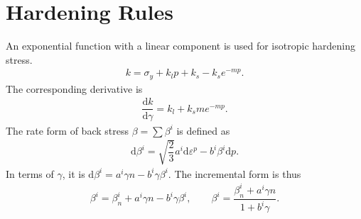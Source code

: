 \documentclass[a4paper,10pt,fleqn]{article}
\newcommand*{\md}[1]{\mathrm{d}#1}
\newcommand*{\ddfrac}[2]{\dfrac{\md#1}{\md#2}}
\begin{document}
\section{Hardening Rules}
An exponential function with a linear component is used for isotropic hardening stress.
\begin{gather}
k=\sigma_y+k_lp+k_s-k_se^{-mp}.
\end{gather}
The corresponding derivative is
\begin{gather}
\ddfrac{k}{\gamma}=k_l+k_sme^{-mp}.
\end{gather}
The rate form of back stress $\displaystyle\beta=\sum\beta^i$ is defined as
\begin{gather*}
\md{\beta^i}=\sqrt{\dfrac{2}{3}}a^i\md{\varepsilon^p}-b^i\beta^i\md{p}.
\end{gather*}
In terms of $\gamma$, it is $\md{\beta^i}=a^i\gamma{}n-b^i\gamma\beta^i$. The incremental form is thus
\begin{gather}
\beta^i=\beta_n^i+a^i\gamma{}n-b^i\gamma\beta^i,\qquad
\beta^i=\dfrac{\beta_n^i+a^i\gamma{}n}{1+b^i\gamma}.
\end{gather}
\end{document}
